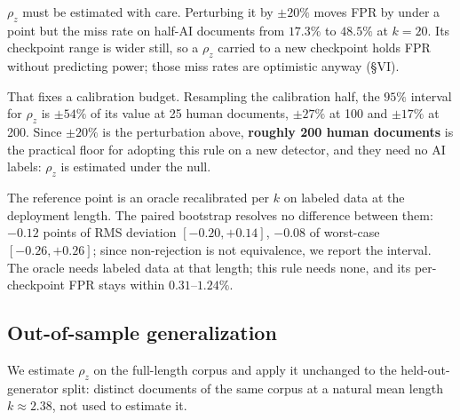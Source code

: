 \documentclass[10pt,conference,a4paper]{IEEEtran}
\newcommand{\sect}[1]{\S#1}
\begin{document}
$\rho_z$ must be estimated with care. Perturbing it by $\pm20\%$ moves FPR by under a
point but the miss rate on half-AI documents from $17.3\%$ to $48.5\%$ at $k{=}20$. Its
checkpoint range is wider still, so a $\rho_z$ carried to a new checkpoint holds FPR
without predicting power; those miss rates are optimistic anyway (\sect{VI}).

That fixes a calibration budget. Resampling the calibration half, the $95\%$ interval
for $\rho_z$ is $\pm54\%$ of its value at 25 human documents, $\pm27\%$ at 100 and
$\pm17\%$ at 200. Since $\pm20\%$ is the perturbation above, \textbf{roughly 200 human
documents} is the practical floor for adopting this rule on a new detector, and they
need no AI labels: $\rho_z$ is estimated under the null.

The reference point is an oracle recalibrated per $k$ on labeled data at the
deployment length. The paired bootstrap resolves no difference between them: $-0.12$
points of RMS deviation $[-0.20,+0.14]$, $-0.08$ of worst-case $[-0.26,+0.26]$; since
non-rejection is not equivalence, we report the interval. The oracle needs labeled data
at that length; this rule needs none, and its per-checkpoint FPR stays within
$0.31$--$1.24\%$.

\subsection{Out-of-sample generalization}
We estimate $\rho_z$ on the full-length corpus and apply it unchanged to the
held-out-generator split: distinct documents of the same corpus at a natural mean length
$k\approx2.38$, not used to estimate it.

\end{document}
